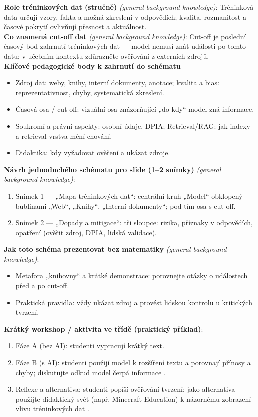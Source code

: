 \documentclass{report}%
\begin{document}
%
\noindent\textbf{Role tréninkových dat (stručně)} \emph{(general background knowledge)}: Tréninková data určují vzory, fakta a možná zkreslení v odpovědích; kvalita, rozmanitost a časové pokrytí ovlivňují přesnost a aktuálnost.\\[6pt]
\noindent\textbf{Co znamená cut‑off dat} \emph{(general background knowledge)}: Cut‑off je poslední časový bod zahrnutí tréninkových dat — model nemusí znát události po tomto datu; v učebním kontextu zdůrazněte ověřování z externích zdrojů.\\[6pt]
\noindent\textbf{Klíčové pedagogické body k zahrnutí do schématu} \begin{itemize}
  \item Zdroj dat: weby, knihy, interní dokumenty, anotace; kvalita a bias: reprezentativnost, chyby, systematická zkreslení.
  \item Časová osa / cut‑off: vizuální osa znázorňující „do kdy“ model zná informace.
  \item Soukromí a právní aspekty: osobní údaje, DPIA; Retrieval/RAG: jak indexy a retrieval vrstva mění chování.
  \item Didaktika: kdy vyžadovat ověření a ukázat zdroje.
\end{itemize}
\noindent\textbf{Návrh jednoduchého schématu pro slide (1–2 snímky)} \emph{(general background knowledge)}: \begin{enumerate}
  \item Snímek 1 — „Mapa tréninkových dat“: centrální kruh „Model“ obklopený bublinami „Web“, „Knihy“, „Interní dokumenty“; pod tím osa s cut‑off.
  \item Snímek 2 — „Dopady a mitigace“: tři sloupce: rizika, příznaky v odpovědích, opatření (ověřit zdroj, DPIA, lidská validace).
\end{enumerate}
\noindent\textbf{Jak toto schéma prezentovat bez matematiky} \emph{(general background knowledge)}: \begin{itemize}
  \item Metafora „knihovny“ a krátké demonstrace: porovnejte otázky o událostech před a po cut‑off.
  \item Praktická pravidla: vždy ukázat zdroj a provést lidskou kontrolu u kritických tvrzení.
\end{itemize}
\noindent\textbf{Krátký workshop / aktivita ve třídě (praktický příklad)}: \begin{enumerate}
  \item Fáze A (bez AI): studenti vypracují krátký text.
  \item Fáze B (s AI): studenti použijí model k rozšíření textu a porovnají přínosy a chyby; diskutujte odkud model čerpá informace \cite{kb_malinka_chatgpt_ve_vyuce_dva_roky_pote_2024_pdf_90bc3aaf_page_12_1}.
  \item Reflexe a alternativa: studenti popíší ověřování tvrzení; jako alternativa použijte didaktický svět (např. Minecraft Education) k názornému zobrazení vlivu tréninkových dat \cite{kb_ai_101_tipu_pdf_04e4a115_page_15_2}.
\end{enumerate}
\end{document}
